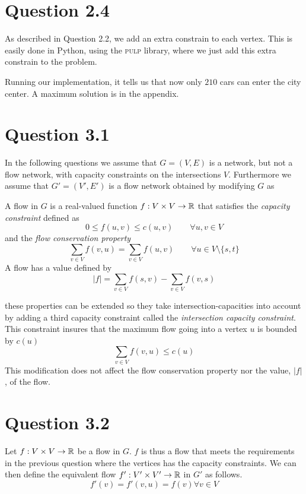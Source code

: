 \documentclass[10pt]{article}
\begin{document}
\section*{Question 2.4} %
\label{sec:question_2_4}
As described in Question 2.2, we add an extra constrain to each vertex.
This is easily done in Python, using the \textsc{pulp} library, where we just add this extra constrain to the problem.

Running our implementation, it tells us that now only $210$ cars can enter the city center.
A maximum solution is in the appendix.

\section*{Question 3.1} %
\label{sec:question_3_1}
In the following questions we assume that $G = (V,E)$ is a network, but not a flow network, with capacity constraints on the intersections $V$. Furthermore we assume that $G' = (V',E')$ is a flow network obtained by modifying $G$ as 

A flow in $G$ is a real-valued function $f: V \times V \rightarrow \mathbb R$ that satisfies the \emph{capacity constraint} defined as
\begin{equation}
 0 \leq f(u,v) \leq c(u,v) \qquad  \forall u,v \in V
\end{equation}
and the \emph{flow conservation property}
\begin{equation}
\sum_{v \in V} f(v,u) = \sum_{v \in V} f(u,v)  \qquad \forall u \in V \setminus \{s,t\}
\end{equation}
A flow has a value defined by
\begin{equation}
 |f| = \sum_{v \in V} f(s,v) - \sum_{v \in V} f(v,s)
\end{equation}

these properties can be extended so they take intersection-capacities into account by adding a third capacity constraint called the \emph{intersection capacity constraint}. This constraint insures that the maximum flow going into a vertex $u$ is bounded by $c(u)$
\begin{equation}
\sum_{v \in V} f(v,u) \leq c(u) 
\end{equation}
This modification does not affect the flow conservation property nor the value, $|f|$, of the flow.


\section*{Question 3.2} %
\label{sec:question_3_2}
Let $f: V \times V \rightarrow \mathbb R$ be a flow in $G$. $f$ is thus a flow that meets the requirements in the previous question where the vertices has the capacity constraints. We can then define the equivalent flow $f': V' \times V' \rightarrow \mathbb R$ in $G'$ as follows. 
\begin{equation}
  f'(v) = 
  f'(v,u) = f(v) \forall v \in V
\end{equation}
\end{document}
